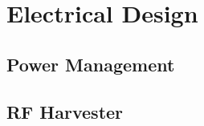 

\setcounter{section}{4}
\section{Electrical Design}
\bigskip


\subsection{Power Management}

\pagebreak
\subsection{RF Harvester}


